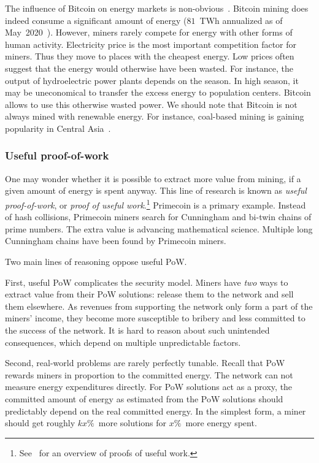 The influence of Bitcoin on energy markets is non-obvious~\cite{Carter2020}.
Bitcoin mining does indeed consume a significant amount of energy ($81$~TWh annualized as of May~2020~\cite{Rauchs2020}).
However, miners rarely compete for energy with other forms of human activity.
Electricity price is the most important competition factor for miners.
Thus they move to places with the cheapest energy.
Low prices often suggest that the energy would otherwise have been wasted.
For instance, the output of hydroelectric power plants depends on the season.
In high season, it may be uneconomical to transfer the excess energy to population centers.
Bitcoin allows to use this otherwise wasted power.
We should note that Bitcoin is not always mined with renewable energy.
For instance, coal-based mining is gaining popularity in Central Asia~\cite{8BTCStaff2020}.


\subsubsection*{Useful proof-of-work}

One may wonder whether it is possible to extract more value from mining, if a given amount of energy is spent anyway.
This line of research is known as \textit{useful proof-of-work}, or \textit{proof of useful work}.\footnote{See~\cite{Ball2017} for an overview of proofs of useful work.}
Primecoin is a primary example.
Instead of hash collisions, Primecoin miners search for Cunningham and bi-twin chains of prime numbers.
The extra value is advancing mathematical science.
Multiple long Cunningham chains have been found by Primecoin miners.

Two main lines of reasoning oppose useful PoW.

First, useful PoW complicates the security model.
Miners have \textit{two} ways to extract value from their PoW solutions: release them to the network and sell them elsewhere.
As revenues from supporting the network only form a part of the miners' income, they become more susceptible to bribery and less committed to the success of the network.
It is hard to reason about such unintended consequences, which depend on multiple unpredictable factors.

Second, real-world problems are rarely perfectly tunable.
Recall that PoW rewards miners in proportion to the committed energy.
The network can not measure energy expenditures directly.
For PoW solutions act as a proxy, the committed amount of energy as estimated from the PoW solutions should predictably depend on the real committed energy.
In the simplest form, a miner should get roughly $kx\%$~more solutions for $x\%$~more energy spent.

